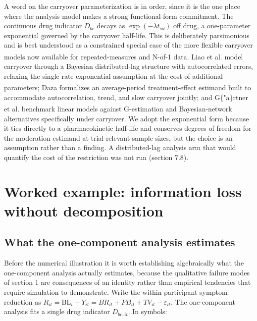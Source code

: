 \documentclass[
  11pt,
]{article}
\begin{document}
A word on the carryover parameterization is in order, since it is the one
place where the analysis model makes a strong functional-form commitment. The
continuous drug indicator \(D_{bc}\) decays as \(\exp(-\lambda t_{sd})\) off drug,
a one-parameter exponential governed by the carryover half-life. This is
deliberately parsimonious and is best understood as a constrained special case
of the more flexible carryover models now available for repeated-measures and
N-of-1 data. Liao et al.\textsuperscript{} model carryover through a Bayesian
distributed-lag structure with autocorrelated errors, relaxing the single-rate
exponential assumption at the cost of additional parameters; Daza\textsuperscript{} formalizes an average-period
treatment-effect estimand built to accommodate autocorrelation, trend, and
slow carryover jointly; and G\{"a\}rtner et al.\textsuperscript{}
benchmark linear models against G-estimation and Bayesian-network alternatives
specifically under carryover. We adopt the exponential form because it ties
directly to a pharmacokinetic half-life and conserves degrees of freedom for
the moderation estimand at trial-relevant sample sizes, but the choice is an
assumption rather than a finding. A distributed-lag analysis arm that would
quantify the cost of the restriction was not run (section 7.8).

\section{Worked example: information loss without decomposition}\label{worked-example-information-loss-without-decomposition}

\subsection{What the one-component analysis estimates}\label{what-the-one-component-analysis-estimates}

Before the numerical illustration it is worth establishing algebraically what
the one-component analysis actually estimates, because the qualitative failure
modes of section 1 are consequences of an identity rather than empirical
tendencies that require simulation to demonstrate. Write the
within-participant symptom reduction as \(R_{it} = \mathrm{BL}_i - Y_{it} =
BR_{it} + PB_{it} + TV_{it} - \varepsilon_{it}\). The one-component analysis
fits a single drug indicator \(D_{bc,it}\). In symbols:
\end{document}

